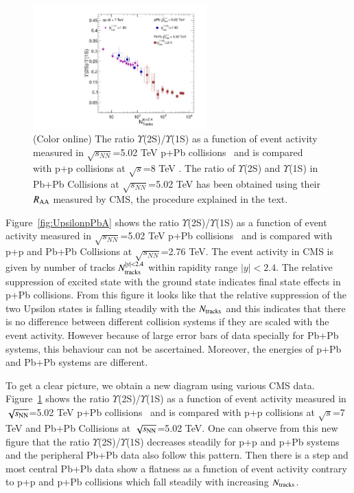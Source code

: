 \begin{figure}
  \begin{center}
    \includegraphics[width=0.60\textwidth]{Figures/Fig15_LHC_Y2SByY1S_NTrk.pdf}
\caption{(Color online)
 The ratio $\Upsilon$(2S)/$\Upsilon$(1S) as a function of event activity measured in 
$\sqrt{s_{NN}}$=5.02 TeV p+Pb collisions~\cite{CMS:2013jsu} and is compared with p+p
collisions at $\sqrt{s}$=8 TeV \cite{CMS:2020fae}.
The ratio of $\Upsilon$(2S) and $\Upsilon$(1S) in Pb+Pb Collisions at
$\sqrt{s_{NN}}$=5.02 TeV has been obtained using their $R_{\rm AA}$ measured by CMS, 
the procedure explained in the text.
}
\label{fig:UpsilonpPb}
\end{center}
\end{figure}



Figure~\ref{fig:UpsilonpPbA} shows
the ratio $\Upsilon$(2S)/$\Upsilon$(1S) as a function of event activity measured in 
$\sqrt{s_{NN}}$=5.02 TeV p+Pb collisions~\cite{CMS:2013jsu} and is compared with p+p
and Pb+Pb Collisions at $\sqrt{s_{NN}}$=2.76 TeV.
The event activity in CMS is given by number of tracks $N_{\rm tracks}^{|y|<2.4}$ within rapidity
range $|y|<2.4$.
The relative suppression of excited state with the ground state indicates final
state effects in p+Pb collisions. 
From this figure it looks like that the relative suppression of
the two Upsilon states is falling steadily with the $N_{\rm tracks}$  and
this indicates that there is no difference between different collision systems if
they are scaled with the event activity. However because of large error bars
of data specially for Pb+Pb systems, this behaviour can not be ascertained.
Moreover, the energies of p+Pb and Pb+Pb systems are different.

To get a clear picture, we obtain a new diagram using various CMS data.
Figure~\ref{fig:UpsilonpPb} shows the ratio $\Upsilon$(2S)/$\Upsilon$(1S) as a function of
event activity measured in $\sqrt{s_{\rm NN}}$=5.02 TeV p+Pb collisions~\cite{CMS:2013jsu}
and is compared with p+p collisions at $\sqrt{s}$=7 TeV \cite{CMS:2020fae} and
Pb+Pb Collisions at $\sqrt{s_{\rm NN}}$=5.02 TeV. One can observe from this new figure
that the ratio $\Upsilon$(2S)/$\Upsilon$(1S) decreases steadily for p+p and p+Pb systems
and the peripheral Pb+Pb data also follow this pattern. Then there is a step and most central Pb+Pb
data show a flatness as a function of event activity contrary to p+p and
p+Pb collisions which fall steadily with increasing $N_{\rm tracks}$.

